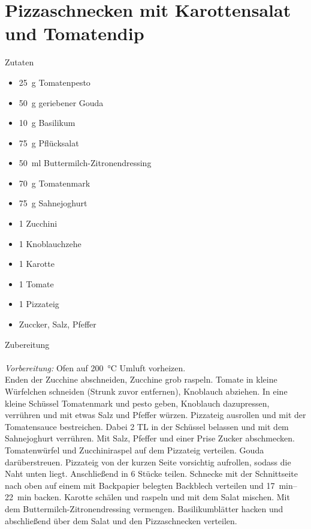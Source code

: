 \section*{Pizzaschnecken mit Karottensalat und Tomatendip}
\ihead{}\ohead{}
\cfoot{}
{\Large Zutaten}
\begin{multicols}{2}
\begin{itemize}
    \item \SI{25}{g} Tomatenpesto
    \item \SI{50}{g} geriebener Gouda
    \item \SI{10}{g} Basilikum
    \item \SI{75}{g} Pflücksalat
    \item \SI{50}{ml} Buttermilch-Zitronendressing 
    \item \SI{70}{g} Tomatenmark
    \item \SI{75}{g} Sahnejoghurt
    \item \num{1} Zucchini
    \item \num{1} Knoblauchzehe
    \item \num{1} Karotte
    \item \num{1} Tomate
    \item \num{1} Pizzateig
    \item Zuccker, Salz, Pfeffer
\end{itemize}
\end{multicols}
\noindent
{\Large Zubereitung}\\
\\
\textit{Vorbereitung:} Ofen auf \SI{200}{\celsius} Umluft vorheizen.\\
Enden der Zucchine abschneiden, Zucchine grob raspeln. 
Tomate in kleine Würfelchen schneiden (Strunk zuvor entfernen), Knoblauch abziehen.
In eine kleine Schüssel Tomatenmark und pesto geben, Knoblauch dazupressen, verrühren und mit etwas Salz und Pfeffer würzen. 
Pizzateig ausrollen und mit der Tomatensauce bestreichen. 
Dabei \num{2} TL in der Schüssel belassen und mit dem Sahnejoghurt verrühren. 
Mit Salz, Pfeffer und einer Prise Zucker abschmecken. 
Tomatenwürfel und Zucchiniraspel auf dem Pizzateig verteilen. 
Gouda darüberstreuen. 
Pizzateig von der kurzen Seite vorsichtig aufrollen, sodass die Naht unten liegt. 
Anschließend in \num{6} Stücke teilen.
Schnecke mit der Schnittseite nach oben auf einem mit Backpapier belegten Backblech verteilen und \SIrange{17}{22}{min} backen. 
Karotte schälen und raspeln und mit dem Salat mischen. 
Mit dem Buttermilch-Zitronendressing vermengen. 
Basilikumblätter hacken und abschließend über dem Salat und den Pizzaschnecken verteilen. 

